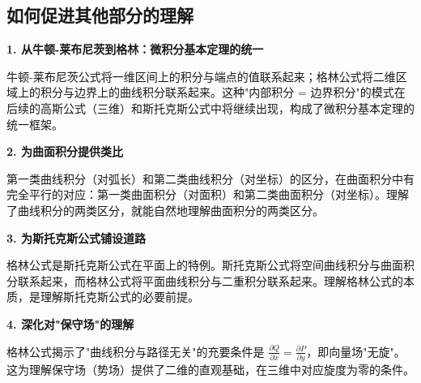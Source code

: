 \subsection{如何促进其他部分的理解}

\begin{connectionbox}
\textbf{1. 从牛顿-莱布尼茨到格林：微积分基本定理的统一}

牛顿-莱布尼茨公式将一维区间上的积分与端点的值联系起来；格林公式将二维区域上的积分与边界上的曲线积分联系起来。这种"内部积分 = 边界积分"的模式在后续的高斯公式（三维）和斯托克斯公式中将继续出现，构成了微积分基本定理的统一框架。

\textbf{2. 为曲面积分提供类比}

第一类曲线积分（对弧长）和第二类曲线积分（对坐标）的区分，在曲面积分中有完全平行的对应：第一类曲面积分（对面积）和第二类曲面积分（对坐标）。理解了曲线积分的两类区分，就能自然地理解曲面积分的两类区分。

\textbf{3. 为斯托克斯公式铺设道路}

格林公式是斯托克斯公式在平面上的特例。斯托克斯公式将空间曲线积分与曲面积分联系起来，而格林公式将平面曲线积分与二重积分联系起来。理解格林公式的本质，是理解斯托克斯公式的必要前提。

\textbf{4. 深化对"保守场"的理解}

格林公式揭示了"曲线积分与路径无关"的充要条件是 $\frac{\partial Q}{\partial x}=\frac{\partial P}{\partial y}$，即向量场"无旋"。这为理解保守场（势场）提供了二维的直观基础，在三维中对应旋度为零的条件。
\end{connectionbox}
